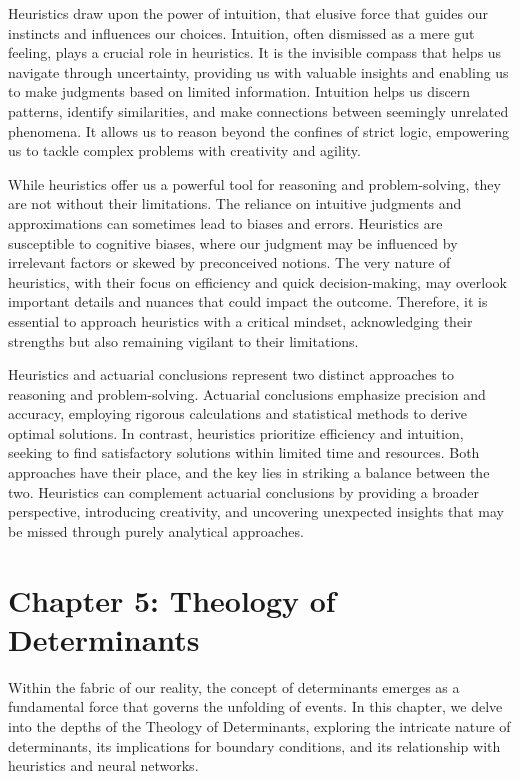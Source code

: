 \documentclass[ebook,12pt,oneside,openany]{memoir}
\begin{document}
\indent Heuristics draw upon the power of intuition, that elusive force that guides our instincts and influences our choices. Intuition, often dismissed as a mere gut feeling, plays a crucial role in heuristics. It is the invisible compass that helps us navigate through uncertainty, providing us with valuable insights and enabling us to make judgments based on limited information. Intuition helps us discern patterns, identify similarities, and make connections between seemingly unrelated phenomena. It allows us to reason beyond the confines of strict logic, empowering us to tackle complex problems with creativity and agility.

\indent While heuristics offer us a powerful tool for reasoning and problem-solving, they are not without their limitations. The reliance on intuitive judgments and approximations can sometimes lead to biases and errors. Heuristics are susceptible to cognitive biases, where our judgment may be influenced by irrelevant factors or skewed by preconceived notions. The very nature of heuristics, with their focus on efficiency and quick decision-making, may overlook important details and nuances that could impact the outcome. Therefore, it is essential to approach heuristics with a critical mindset, acknowledging their strengths but also remaining vigilant to their limitations.

\indent Heuristics and actuarial conclusions represent two distinct approaches to reasoning and problem-solving. Actuarial conclusions emphasize precision and accuracy, employing rigorous calculations and statistical methods to derive optimal solutions. In contrast, heuristics prioritize efficiency and intuition, seeking to find satisfactory solutions within limited time and resources. Both approaches have their place, and the key lies in striking a balance between the two. Heuristics can complement actuarial conclusions by providing a broader perspective, introducing creativity, and uncovering unexpected insights that may be missed through purely analytical approaches.
\chapter*{Chapter 5: Theology of Determinants}


\indent \indent Within the fabric of our reality, the concept of determinants emerges as a fundamental force that governs the unfolding of events. In this chapter, we delve into the depths of the Theology of Determinants, exploring the intricate nature of determinants, its implications for boundary conditions, and its relationship with heuristics and neural networks.
\end{document}
